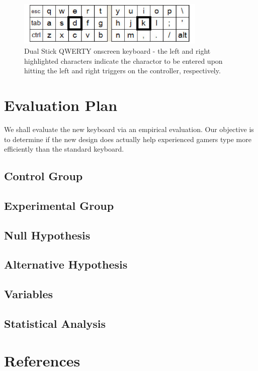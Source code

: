\documentclass[
	letterpaper, %
]{jdf}
\begin{document}
\begin{figure}[h]
	\centering
	\includegraphics[width=9cm]{jdf-master/Figures/dual-stick-keyboard.png}
	\caption{Dual Stick QWERTY onscreen keyboard - the left and right highlighted characters indicate the charactor to be entered upon hitting the left and right triggers on the controller, respectively.}
	\label{fig:dual-stick-qwerty}
\end{figure}



\section{Evaluation Plan}
We shall evaluate the new keyboard via an empirical evaluation. Our objective is to determine if the new design does actually help experienced gamers type more efficiently than the standard keyboard.

\subsection{Control Group}

\subsection{Experimental Group}

\subsection{Null Hypothesis}

\subsection{Alternative Hypothesis}

\subsection{Variables}

\subsection{Statistical Analysis}

\section{References}

\printbibliography[heading=none]
\end{document}
